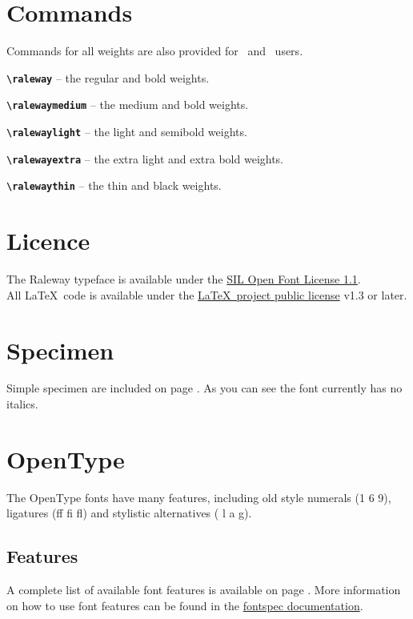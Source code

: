 \documentclass[10pt,a4paper,english]{article}
\begin{document}
\begin{multicols}{2}
\section{Commands}
Commands for all weights are also provided for \XeLaTeX\ and \LuaLaTeX\ users.
\begin{itemize*}
	\item \texttt{\bfseries \textbackslash raleway}
		-- the regular and bold weights.
	\item \texttt{\bfseries \textbackslash ralewaymedium}
		-- the medium and bold weights.
	\item \texttt{\bfseries \textbackslash ralewaylight}
		-- the light and semibold weights.
	\item \texttt{\bfseries \textbackslash ralewayextra}
		-- the extra light and extra bold weights.
	\item \texttt{\bfseries \textbackslash ralewaythin}
		-- the thin and black weights.
\end{itemize*}

\section{Licence}
The Raleway typeface is available under the \href{http://scripts.sil.org/OFL}{SIL Open Font License 1.1}.\\
All \LaTeX\ code is available under the \href{http://www.latex-project.org/lppl/}{\LaTeX\ project public license} v1.3 or later.

\section{Specimen}
Simple specimen are included on page \pageref{sec:specimen}.
As you can see the font currently has no italics.

\section{OpenType}
The OpenType fonts have many features, including old style numerals (1 6 9),  ligatures (ff fi fl) and stylistic alternatives ({ l a g}).

\subsection{Features}
A complete list of available font features is available on page \pageref{sec:otfinfo}. More information on how to use font features can be found in the \href{http://mirror.ctan.org/macros/latex/contrib/fontspec/fontspec.pdf}{fontspec documentation}.


\end{multicols}
\end{document}

